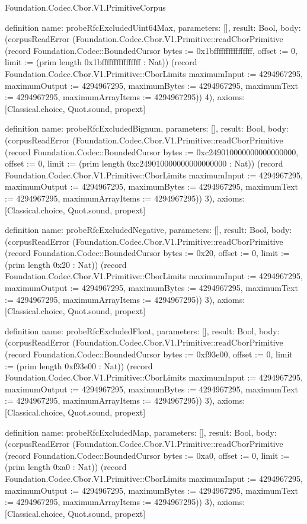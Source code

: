\begin{lexlean}{Foundation.Codec.Cbor.V1.PrimitiveCorpus}
\begin{semanticmodule}
definition{
  name: probeRfcExcludedUint64Max,
  parameters: [],
  result: Bool,
  body: (corpusReadError (Foundation.Codec.Cbor.V1.Primitive::readCborPrimitive (record Foundation.Codec::BoundedCursor {bytes := 0x1bffffffffffffffff, offset := 0, limit := (prim length 0x1bffffffffffffffff : Nat)}) (record Foundation.Codec.Cbor.V1.Primitive::CborLimits {maximumInput := 4294967295, maximumOutput := 4294967295, maximumBytes := 4294967295, maximumText := 4294967295, maximumArrayItems := 4294967295})) 4),
  axioms: [Classical.choice, Quot.sound, propext]
}

definition{
  name: probeRfcExcludedBignum,
  parameters: [],
  result: Bool,
  body: (corpusReadError (Foundation.Codec.Cbor.V1.Primitive::readCborPrimitive (record Foundation.Codec::BoundedCursor {bytes := 0xc249010000000000000000, offset := 0, limit := (prim length 0xc249010000000000000000 : Nat)}) (record Foundation.Codec.Cbor.V1.Primitive::CborLimits {maximumInput := 4294967295, maximumOutput := 4294967295, maximumBytes := 4294967295, maximumText := 4294967295, maximumArrayItems := 4294967295})) 3),
  axioms: [Classical.choice, Quot.sound, propext]
}

definition{
  name: probeRfcExcludedNegative,
  parameters: [],
  result: Bool,
  body: (corpusReadError (Foundation.Codec.Cbor.V1.Primitive::readCborPrimitive (record Foundation.Codec::BoundedCursor {bytes := 0x20, offset := 0, limit := (prim length 0x20 : Nat)}) (record Foundation.Codec.Cbor.V1.Primitive::CborLimits {maximumInput := 4294967295, maximumOutput := 4294967295, maximumBytes := 4294967295, maximumText := 4294967295, maximumArrayItems := 4294967295})) 3),
  axioms: [Classical.choice, Quot.sound, propext]
}

definition{
  name: probeRfcExcludedFloat,
  parameters: [],
  result: Bool,
  body: (corpusReadError (Foundation.Codec.Cbor.V1.Primitive::readCborPrimitive (record Foundation.Codec::BoundedCursor {bytes := 0xf93e00, offset := 0, limit := (prim length 0xf93e00 : Nat)}) (record Foundation.Codec.Cbor.V1.Primitive::CborLimits {maximumInput := 4294967295, maximumOutput := 4294967295, maximumBytes := 4294967295, maximumText := 4294967295, maximumArrayItems := 4294967295})) 3),
  axioms: [Classical.choice, Quot.sound, propext]
}

definition{
  name: probeRfcExcludedMap,
  parameters: [],
  result: Bool,
  body: (corpusReadError (Foundation.Codec.Cbor.V1.Primitive::readCborPrimitive (record Foundation.Codec::BoundedCursor {bytes := 0xa0, offset := 0, limit := (prim length 0xa0 : Nat)}) (record Foundation.Codec.Cbor.V1.Primitive::CborLimits {maximumInput := 4294967295, maximumOutput := 4294967295, maximumBytes := 4294967295, maximumText := 4294967295, maximumArrayItems := 4294967295})) 3),
  axioms: [Classical.choice, Quot.sound, propext]
}


\end{semanticmodule}
\end{lexlean}

